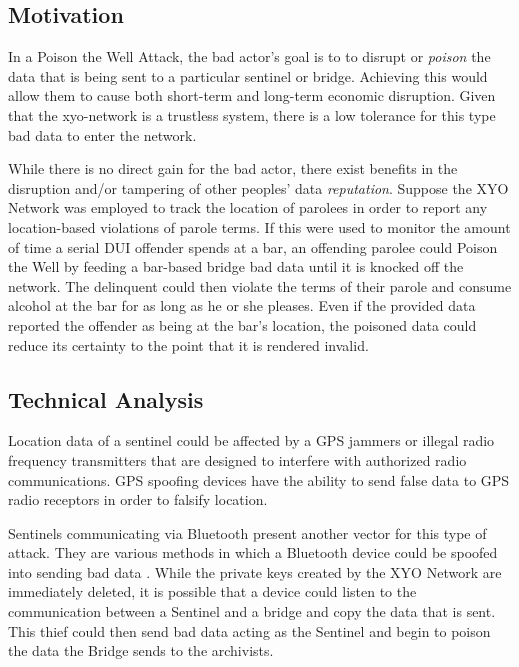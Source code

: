 \documentclass{article}
\begin{document}
\subsection{Motivation}
In a Poison the Well Attack, the bad actor's goal is to to disrupt or \textit{poison} the data that is being sent to a particular \Gls{sentinel} or \Gls{bridge}. Achieving this would allow them to cause both short-term and long-term economic disruption. Given that the \Gls{xyo-network} is a \gls{trustless} system, there is a low tolerance for this type bad data to enter the network. 

While there is no direct gain for the bad actor, there exist benefits in the disruption and/or tampering of other peoples' data \textit{reputation}. Suppose the XYO Network was employed to track the location of parolees in order to report any location-based violations of parole terms. If this were used to monitor the amount of time a serial DUI offender spends at a bar, an offending parolee could Poison the Well by feeding a bar-based \Gls{bridge} bad data until it is knocked off the network. The delinquent could then violate the terms of their parole and consume alcohol at the bar for as long as he or she pleases. Even if the provided data reported the offender as being at the bar's location, the poisoned data could reduce its certainty to the point that it is rendered invalid.

\subsection{Technical Analysis}
Location data of a \Gls{sentinel} could be affected by a GPS jammers or illegal radio frequency transmitters that are designed to interfere with authorized radio communications. GPS spoofing devices \cite{jafarina-gps} have the ability to send false data to GPS radio receptors in order to falsify location. 

Sentinels communicating via Bluetooth present another vector for this type of attack. They are various methods in which a Bluetooth device could be spoofed into sending bad data \cite{padgette-bluetooth}. While the private keys created by the XYO Network are immediately deleted, it is possible that a device could listen to the communication between a Sentinel and a \Gls{bridge} and copy the data that is sent. This thief could then send bad data acting as the Sentinel and begin to poison the data the Bridge sends to the \Glspl{archivist}. 
\end{document}
